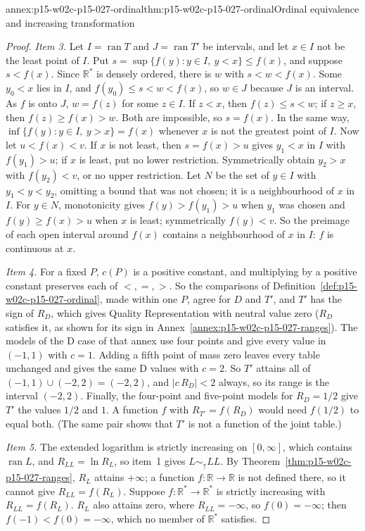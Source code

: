 \begin{annexitem}{annex:p15-w02c-p15-027-ordinal}{thm:p15-w02c-p15-027-ordinal}{Ordinal equivalence and increasing transformation}
\begin{proof}
\emph{Item 3.} Let \(I=\operatorname{ran}T\) and
\(J=\operatorname{ran}T'\) be intervals, and let \(x\in I\) not be the
least point of \(I\). Put \(s=\sup\{f(y):y\in I,\ y<x\}\leq f(x)\), and
suppose \(s<f(x)\). Since \(\mathbb R^*\) is densely ordered, there is
\(w\) with \(s<w<f(x)\). Some \(y_0<x\) lies in \(I\), and
\(f(y_0)\leq s<w<f(x)\), so \(w\in J\) because \(J\) is an interval. As
\(f\) is onto \(J\), \(w=f(z)\) for some \(z\in I\). If \(z<x\), then
\(f(z)\leq s<w\); if \(z\geq x\), then \(f(z)\geq f(x)>w\). Both are
impossible, so \(s=f(x)\). In the same way,
\(\inf\{f(y):y\in I,\ y>x\}=f(x)\) whenever \(x\) is not the greatest
point of \(I\). Now let \(u<f(x)<v\). If \(x\) is not least, then
\(s=f(x)>u\) gives \(y_1<x\) in \(I\) with \(f(y_1)>u\); if \(x\) is
least, put no lower restriction. Symmetrically obtain \(y_2>x\) with
\(f(y_2)<v\), or no upper restriction. Let \(N\) be the set of
\(y\in I\) with \(y_1<y<y_2\), omitting a bound that was not chosen;
it is a neighbourhood of \(x\) in \(I\). For \(y\in N\), monotonicity
gives \(f(y)>f(y_1)>u\) when \(y_1\) was chosen and
\(f(y)\geq f(x)>u\) when \(x\) is least; symmetrically \(f(y)<v\).
So the preimage of each open interval around \(f(x)\) contains
a neighbourhood of \(x\) in \(I\): \(f\) is continuous at \(x\).

\emph{Item 4.} For a fixed \(P\), \(c(P)\) is a positive constant, and
multiplying by a positive constant preserves each of \(<,=,>\). So the
comparisons of Definition~\ref{def:p15-w02c-p15-027-ordinal}, made
within one \(P\), agree for \(D\) and \(T'\), and \(T'\) has the sign of
\(R_D\), which gives Quality Representation with neutral value zero
(\(R_D\) satisfies it, as shown for its sign in
Annex~\ref{annex:p15-w02c-p15-027-ranges}). The models of the D case of
that annex use four points and give every value in \((-1,1)\) with
\(c=1\). Adding a fifth point of mass zero leaves every table unchanged
and gives the same D values with \(c=2\). So \(T'\) attains all of
\((-1,1)\cup(-2,2)=(-2,2)\), and \(|c\,R_D|<2\) always, so its range is
the interval \((-2,2)\). Finally, the four-point and five-point models
for \(R_D=1/2\) give \(T'\) the values \(1/2\) and \(1\). A function
\(f\) with \(R_{T'}=f(R_D)\) would need \(f(1/2)\) to equal both. (The
same pair shows that \(T'\) is not a function of the joint table.)

\emph{Item 5.} The extended logarithm is strictly increasing on
\([0,\infty]\), which contains \(\operatorname{ran}L\), and
\(R_{LL}=\ln R_L\), so item~1 gives \(L\sim_{\uparrow}LL\). By
Theorem~\ref{thm:p15-w02c-p15-027-ranges}, \(R_L\) attains \(+\infty\);
a function \(f:\mathbb R\to\mathbb R\) is not defined there, so it cannot
give \(R_{LL}=f(R_L)\). Suppose \(f:\mathbb R^*\to\mathbb R^*\) is
strictly increasing with \(R_{LL}=f(R_L)\). \(R_L\) also attains zero,
where \(R_{LL}=-\infty\), so \(f(0)=-\infty\); then \(f(-1)<f(0)=-\infty\),
which no member of \(\mathbb R^*\) satisfies.
\end{proof}
\end{annexitem}

